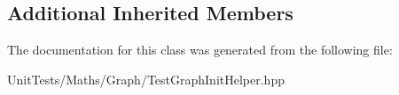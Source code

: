 \subsection*{Additional Inherited Members}


The documentation for this class was generated from the following file\+:\begin{DoxyCompactItemize}
\item 
Unit\+Tests/\+Maths/\+Graph/Test\+Graph\+Init\+Helper.\+hpp\end{DoxyCompactItemize}
